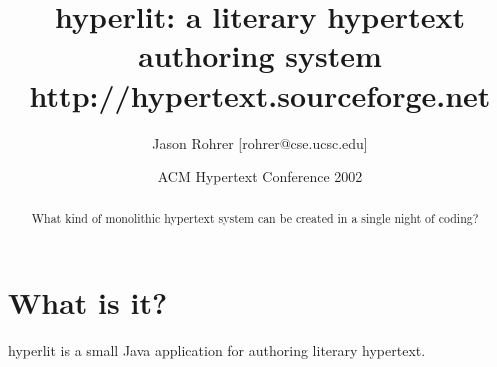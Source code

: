 \documentclass[12pt]{article}
\begin{document}
\newcommand{\http}{{\sc http}}
\newcommand{\url}{{\sc url}}


\newcommand{\insertfigure}[4] {
	\begin{figure}[tb]
		\begin{center}
			\fbox{
				\begin{minipage}{#1}
					\texttt{[image: \#2]}
				
					\caption{#3}
				
					\label{#4}
				\end{minipage}
			} 
		\end{center}
	\end{figure}
}

\newlength{\oldUnitLength}

\newcommand{\insertpicture}[5] {
	\begin{figure}[tb]
		\begin{center}
			\fbox{
				\begin{minipage}{#1}
                    \begin{pspicture*}(0,0)(\textwidth, #2\textwidth)
                    \psset{xunit=\textwidth}
                    \psset{yunit=\textwidth}
                    \psset{runit=\textwidth}                 
                        #5
                    \end{pspicture*}
					\caption{#3}
				
					\label{#4}
				\end{minipage}
			} 
		\end{center}
	\end{figure}
}






\author{Jason Rohrer [rohrer@cse.ucsc.edu]}
\date{ACM Hypertext Conference 2002}
\title{hyperlit:  a literary hypertext authoring system\\ http://hypertext.sourceforge.net}


\maketitle


\begin{abstract}
What kind of monolithic hypertext system can be created in a single night of coding?
\end{abstract}


\section{What is it?}
hyperlit is a small Java application for authoring literary hypertext.
\end{document}
